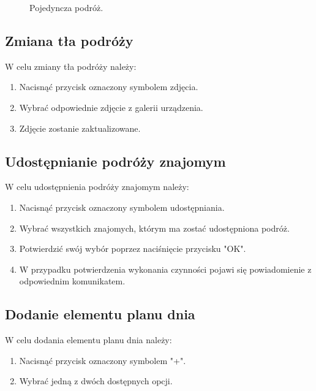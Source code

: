 \begin{figure}[h]
\centering

\centering
\null\hfill
{}
\hfill
{}
\hfill\null

\caption{Pojedyncza podróż.}
\label{fig:podrecznik3}
\end{figure}
\FloatBarrier

\subsection{Zmiana tła podróży}

W celu zmiany tła podróży należy:
\begin{enumerate}
\item Nacisnąć przycisk oznaczony symbolem zdjęcia.
\item Wybrać odpowiednie zdjęcie z galerii urządzenia.
\item Zdjęcie zostanie zaktualizowane.
\end{enumerate}

\subsection{Udostępnianie podróży znajomym}

W celu udostępnienia podróży znajomym należy:
\begin{enumerate}
\item Nacisnąć przycisk oznaczony symbolem udostępniania.
\item Wybrać wszystkich znajomych, którym ma zostać udostępniona podróż.
\item Potwierdzić swój wybór poprzez naciśnięcie przycisku "OK".
\item W przypadku potwierdzenia wykonania czynności pojawi się powiadomienie z odpowiednim komunikatem.
\end{enumerate}

\subsection{Dodanie elementu planu dnia}
W celu dodania elementu planu dnia należy:
\begin{enumerate}
\item Nacisnąć przycisk oznaczony symbolem "+".
\item Wybrać jedną z dwóch dostępnych opcji.
\end{enumerate}

